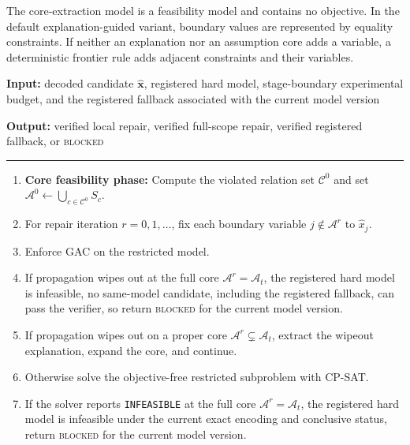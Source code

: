 \documentclass[pdflatex,sn-mathphys-num,iicol,oneside]{sn-jnl}
\newcommand{\algin}[1]{\textbf{Input:} #1\par}
\newcommand{\algout}[1]{%
  \textbf{Output:} #1\par
  \vspace{2pt}\hrule\vspace{3pt}%
}
\newenvironment{algsteps}
  {\begin{enumerate}[
      leftmargin=1.8em,
      itemsep=1pt,
      parsep=0pt,
      topsep=2pt,
      label=\arabic*:
    ]}
  {\end{enumerate}}
\newcommand{\gac}{\textsc{GAC}\xspace}
\newcommand{\cpsat}{\textsc{CP-SAT}\xspace}
\begin{document}
The core-extraction model is a feasibility model and contains no
objective. In the default explanation-guided variant, boundary values
are represented by equality constraints. If neither an explanation
nor an assumption core adds a variable, a deterministic frontier rule
adds adjacent constraints and their variables.

\begin{algorithm}[H]
\caption{Explanation-guided repair-core expansion}
\label{alg:repair}
\small

\algin{
decoded candidate $\widehat{\bm{x}}$,
registered hard model,
stage-boundary experimental budget,
and the registered fallback associated with the current model version
}

\algout{
verified local repair,
verified full-scope repair,
verified registered fallback,
or \textsc{blocked}
}

\begin{algsteps}

\item \textbf{Core feasibility phase:} Compute the violated relation set $\mathcal{C}^{0}$ and set $\mathcal{A}^{0} \leftarrow \bigcup_{c\in\mathcal{C}^{0}}S_c$.

\item For repair iteration $r=0,1,\ldots$, fix each boundary variable $j\notin\mathcal{A}^{r}$ to $\widehat{x}_j$.

\item Enforce \gac on the restricted model.

\item If propagation wipes out at the full core $\mathcal{A}^{r}=\mathcal{A}_t$, the registered hard model is infeasible, no same-model candidate, including the registered fallback, can pass the verifier, so return \textsc{blocked} for the current model version.

\item If propagation wipes out on a proper core $\mathcal{A}^{r}\subsetneq\mathcal{A}_t$, extract the wipeout explanation, expand the core, and continue.

\item Otherwise solve the objective-free restricted subproblem with \cpsat.

\item If the solver reports \texttt{INFEASIBLE} at the full core $\mathcal{A}^{r}=\mathcal{A}_t$, the registered hard model is infeasible under the current exact encoding and conclusive status, return \textsc{blocked} for the current model version.


\end{algsteps}
\end{algorithm}
\end{document}

